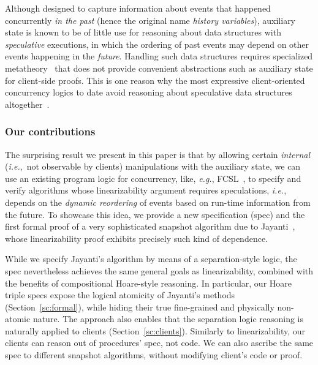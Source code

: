 \documentclass[a4paper,UKenglish]{lipics-v2016}
\newcommand{\ie}{\emph{i.e.}\xspace}
\newcommand{\eg}{\emph{e.g.}\xspace}
\theoremstyle{definition}
\begin{document}
Although designed to capture information about events that happened
concurrently \emph{in the past} (hence the original name \emph{history
  variables}), auxiliary state is known to be of little use for
reasoning about data structures with \emph{speculative} executions, in
which the ordering of past events may depend on other events happening
in the \emph{future}. Handling such data structures requires
specialized metatheory~\cite{LiangF+PLDI13} that does not provide
convenient abstractions such as auxiliary state for client-side
proofs. This is one reason why the most expressive client-oriented
concurrency logics to date avoid reasoning about speculative data
structures altogether~\cite{JungKBD+ICFP16}.

\subsubsection*{Our contributions}

The surprising result we present in this paper is that by allowing
certain \emph{internal} (\ie,~not observable by clients) manipulations
with the auxiliary state, we can use an existing program logic for
concurrency, like, \eg,
FCSL~\cite{NanevskiLSD+ESOP14,SergeyNB+PLDI15}, to specify and verify
algorithms whose linearizability argument requires speculations, \ie,
depends on the \emph{dynamic reordering} of events based on run-time
information from the future.
%
%
To showcase this idea, we provide a new specification (spec) and the
first formal proof of a very sophisticated snapshot algorithm due to
Jayanti~\cite{Jayanti+STOC05}, whose linearizability proof exhibits
precisely such kind of dependence.

While we specify Jayanti's algorithm by means of a separation-style
logic, the spec nevertheless achieves the same general goals as
linearizability, combined with the benefits of compositional
Hoare-style reasoning.
%
In particular, our Hoare triple specs expose the logical atomicity of
Jayanti's methods (Section~\ref{sc:formal}), while hiding their true
fine-grained and physically non-atomic nature.  The approach also
enables that the separation logic reasoning is naturally applied to
clients (Section~\ref{sc:clients}).
%
Similarly to linearizability, our clients can reason out of
procedures' spec, not code. We can also ascribe the same spec to
different snapshot algorithms, without modifying client's code or
proof.
\end{document}
